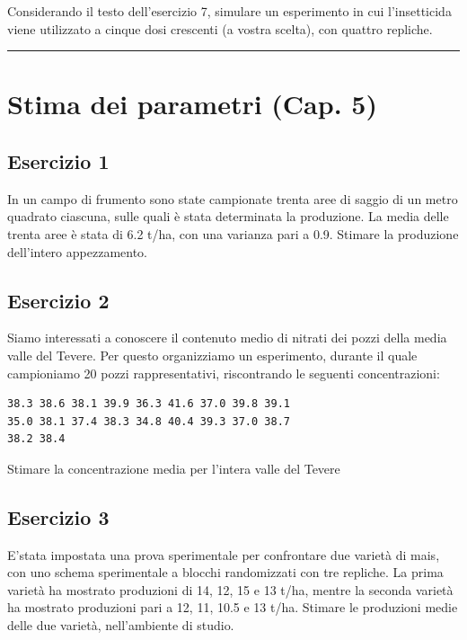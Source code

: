 \documentclass[a4paper,12pt,oneside]{book}
\begin{document}
Considerando il testo dell'esercizio 7, simulare un esperimento in cui l'insetticida viene utilizzato a cinque dosi crescenti (a vostra scelta), con quattro repliche.

\begin{center}\rule{0.5\linewidth}{0.5pt}\end{center}

\hypertarget{stima-dei-parametri-cap.-5}{%
\section{Stima dei parametri (Cap. 5)}\label{stima-dei-parametri-cap.-5}}

\hypertarget{esercizio-1-3}{%
\subsection{Esercizio 1}\label{esercizio-1-3}}

In un campo di frumento sono state campionate trenta aree di saggio di un metro quadrato ciascuna, sulle quali è stata determinata la produzione. La media delle trenta aree è stata di 6.2 t/ha, con una varianza pari a 0.9. Stimare la produzione dell'intero appezzamento.

\hypertarget{esercizio-2-3}{%
\subsection{Esercizio 2}\label{esercizio-2-3}}

Siamo interessati a conoscere il contenuto medio di nitrati dei pozzi della media valle del Tevere. Per questo organizziamo un esperimento, durante il quale campioniamo 20 pozzi rappresentativi, riscontrando le seguenti concentrazioni:

\begin{verbatim}
38.3 38.6 38.1 39.9 36.3 41.6 37.0 39.8 39.1     
35.0 38.1 37.4 38.3 34.8 40.4 39.3 37.0 38.7    
38.2 38.4    
\end{verbatim}

Stimare la concentrazione media per l'intera valle del Tevere

\hypertarget{esercizio-3-3}{%
\subsection{Esercizio 3}\label{esercizio-3-3}}

E'stata impostata una prova sperimentale per confrontare due varietà di mais, con uno schema sperimentale a blocchi randomizzati con tre repliche. La prima varietà ha mostrato produzioni di 14, 12, 15 e 13 t/ha, mentre la seconda varietà ha mostrato produzioni pari a 12, 11, 10.5 e 13 t/ha. Stimare le produzioni medie delle due varietà, nell'ambiente di studio.
\end{document}
